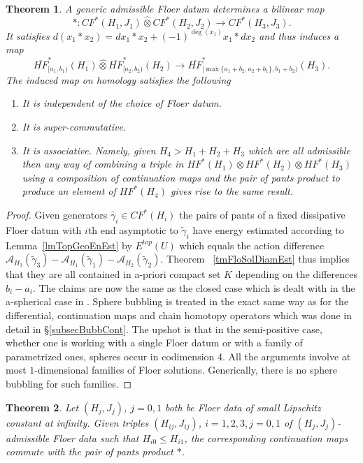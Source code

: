 \documentclass[11pt]{amsart}
\newtheorem{tm}{Theorem}[section]
\theoremstyle{definition}
\theoremstyle{remark}
\begin{document}
\begin{tm}\label{tmDisProd}
A generic admissible Floer datum determines a bilinear map
\[
*:CF^*(H_1,J_1)\hat{\otimes}CF^*(H_2,J_2)\to CF^*(H_3,J_3).
\]
It satisfies $d(x_1*x_2)=dx_1*x_2+(-1)^{\deg (x_1)}x_1*dx_2$ and thus induces a map
\[
\overline{HF}^*_{[a_1,b_1)}(H_1)\hat{\otimes}\overline{HF}_{[a_2,b_2)}^*(H_2)\to\overline{HF}_{[\max\{a_1+b_2,a_2+b_1\},b_1+b_2)}^*(H_3).
\]
The induced map on homology satisfies the following
\begin{enumerate}
    \item It is independent of the choice of Floer datum.
    \item It is super-commutative.
    \item It is associative. Namely, given $H_4>H_1+H_2+H_3$ which are all admissible then any way of combining a triple in $HF^*(H_1)\otimes HF^*(H_2)\otimes HF^*(H_3)$ using a composition of continuation maps and the pair of pants product to produce an element of $HF^*(H_4)$ gives rise to the same result.
    \end{enumerate}
 \end{tm}
\begin{proof}
Given generators $\tilde{\gamma_i}\in CF^*(H_i)$ the pairs of pants of a fixed dissipative Floer datum with $i$th end asymptotic to $\tilde{\gamma}_i$ have energy estimated according to Lemma~\ref{lmTopGeoEnEst} by $E^{top}(U)$ which equals the action difference $\mathcal{A}_{H_3}(\tilde{\gamma}_3)-\mathcal{A}_{H_1}(\tilde{\gamma}_1)-\mathcal{A}_{H_2}(\tilde{\gamma}_2).$
Theorem ~\ref{tmFloSolDiamEst} thus implies that they
are all contained in a-priori compact set $K$ depending on the differences $b_i-a_i$. The claims are now the same as the closed case which is dealt with in the a-spherical case in \cite{Schwarz95}. Sphere bubbling is treated in the exact same way as for the differential, continuation maps and chain homotopy operators which was done in detail in \S\ref{subsecBubbCont}. The upshot is that in the semi-positive case, whether one is working with a single Floer datum or with a family of parametrized ones, spheres occur in codimension 4. All the arguments involve at most $1$-dimensional families of Floer solutions. Generically, there is no sphere bubbling for such families.
\end{proof}
\begin{tm}\label{tmProdIndep}
Let $(H_j,J_j)$, $j=0,1$ both be Floer data of small Lipschitz constant at infinity. Given triples $(H_{ij},J_{ij})$, $i=1,2,3,j=0,1$ of $(H_j,J_j)$-admissible Floer data such that $H_{i0}\leq H_{i1}$, the corresponding continuation maps commute with the pair of pants product $*$.
\end{tm}
\end{document}
